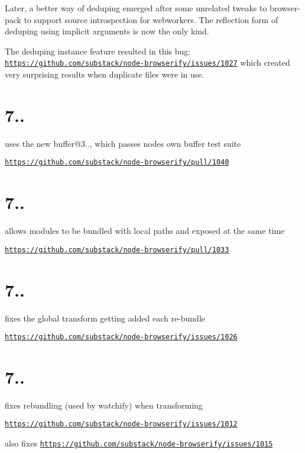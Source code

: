 Later, a better way of deduping emerged after some unrelated tweaks to browser-\/pack to support source introspection for webworkers. The reflection form of deduping using implicit arguments is now the only kind.

The deduping instance feature resulted in this bug\+: \href{https://github.com/substack/node-browserify/issues/1027}{\tt https\+://github.\+com/substack/node-\/browserify/issues/1027} which created very surprising results when duplicate files were in use.

\section*{7..}

uses the new buffer@3.., which passes node\textquotesingle{}s own buffer test suite

\href{https://github.com/substack/node-browserify/pull/1040}{\tt https\+://github.\+com/substack/node-\/browserify/pull/1040}

\section*{7..}

allows modules to be bundled with local paths and exposed at the same time

\href{https://github.com/substack/node-browserify/pull/1033}{\tt https\+://github.\+com/substack/node-\/browserify/pull/1033}

\section*{7..}

fixes the global transform getting added each re-\/bundle

\href{https://github.com/substack/node-browserify/issues/1026}{\tt https\+://github.\+com/substack/node-\/browserify/issues/1026}

\section*{7..}

fixes rebundling (used by watchify) when transforming

\href{https://github.com/substack/node-browserify/issues/1012}{\tt https\+://github.\+com/substack/node-\/browserify/issues/1012}

also fixes \href{https://github.com/substack/node-browserify/issues/1015}{\tt https\+://github.\+com/substack/node-\/browserify/issues/1015}

